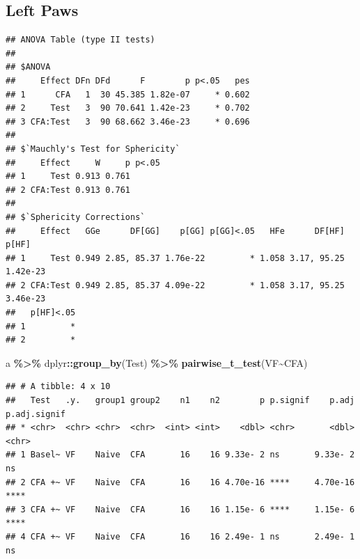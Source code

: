 \documentclass[
]{book}
\newenvironment{Shaded}{\begin{snugshade}}{\end{snugshade}}
\newcommand{\AttributeTok}[1]{\textcolor[rgb]{0.13,0.29,0.53}{#1}}
\newcommand{\FunctionTok}[1]{\textcolor[rgb]{0.13,0.29,0.53}{\textbf{#1}}}
\newcommand{\NormalTok}[1]{#1}
\newcommand{\OtherTok}[1]{\textcolor[rgb]{0.56,0.35,0.01}{#1}}
\newcommand{\SpecialCharTok}[1]{\textcolor[rgb]{0.81,0.36,0.00}{\textbf{#1}}}
\newcommand{\StringTok}[1]{\textcolor[rgb]{0.31,0.60,0.02}{#1}}
\begin{document}
\subsection*{Left Paws}\label{left-paws-1}

\begin{Shaded}
\end{Shaded}

\begin{verbatim}
## ANOVA Table (type II tests)
## 
## $ANOVA
##     Effect DFn DFd      F        p p<.05   pes
## 1      CFA   1  30 45.385 1.82e-07     * 0.602
## 2     Test   3  90 70.641 1.42e-23     * 0.702
## 3 CFA:Test   3  90 68.662 3.46e-23     * 0.696
## 
## $`Mauchly's Test for Sphericity`
##     Effect     W     p p<.05
## 1     Test 0.913 0.761      
## 2 CFA:Test 0.913 0.761      
## 
## $`Sphericity Corrections`
##     Effect   GGe      DF[GG]    p[GG] p[GG]<.05   HFe      DF[HF]    p[HF]
## 1     Test 0.949 2.85, 85.37 1.76e-22         * 1.058 3.17, 95.25 1.42e-23
## 2 CFA:Test 0.949 2.85, 85.37 4.09e-22         * 1.058 3.17, 95.25 3.46e-23
##   p[HF]<.05
## 1         *
## 2         *
\end{verbatim}

\begin{Shaded}
\begin{Highlighting}[]
\NormalTok{a }\SpecialCharTok{\%\textgreater{}\%}
\NormalTok{  dplyr}\SpecialCharTok{::}\FunctionTok{group\_by}\NormalTok{(Test) }\SpecialCharTok{\%\textgreater{}\%}
  \FunctionTok{pairwise\_t\_test}\NormalTok{(VF}\SpecialCharTok{\textasciitilde{}}\NormalTok{CFA)}
\end{Highlighting}
\end{Shaded}

\begin{verbatim}
## # A tibble: 4 x 10
##   Test   .y.   group1 group2    n1    n2        p p.signif    p.adj p.adj.signif
## * <chr>  <chr> <chr>  <chr>  <int> <int>    <dbl> <chr>       <dbl> <chr>       
## 1 Basel~ VF    Naive  CFA       16    16 9.33e- 2 ns       9.33e- 2 ns          
## 2 CFA +~ VF    Naive  CFA       16    16 4.70e-16 ****     4.70e-16 ****        
## 3 CFA +~ VF    Naive  CFA       16    16 1.15e- 6 ****     1.15e- 6 ****        
## 4 CFA +~ VF    Naive  CFA       16    16 2.49e- 1 ns       2.49e- 1 ns
\end{verbatim}
\end{document}
